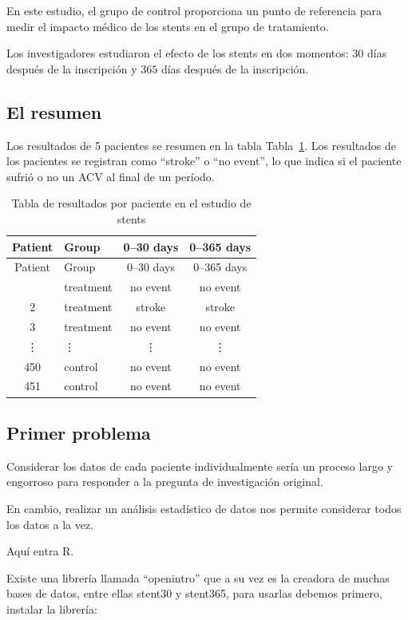 \documentclass[
  spanish,
  letterpaper,
  DIV=11,
  numbers=noendperiod]{scrartcl}
\begin{document}
En este estudio, el grupo de control proporciona un punto de referencia
para medir el impacto médico de los stents en el grupo de tratamiento.

Los investigadores estudiaron el efecto de los stents en dos momentos:
\(30\) días después de la inscripción y \(365\) días después de la
inscripción.

\subsection{El resumen}\label{el-resumen}

Los resultados de 5 pacientes se resumen en la tabla
Tabla~\ref{tbl-stent-data}. Los resultados de los pacientes se registran
como ``stroke'' o ``no event'', lo que indica si el paciente sufrió o no
un ACV al final de un período.

\begin{longtable}[]{@{}clcc@{}}
\caption{Tabla de resultados por paciente en el estudio de
stents}\label{tbl-stent-data}\tabularnewline
\toprule\noalign{}
Patient & Group & 0--30 days & 0--365 days \\
\midrule\noalign{}
\endfirsthead
\toprule\noalign{}
Patient & Group & 0--30 days & 0--365 days \\
\midrule\noalign{}
\endhead
\bottomrule\noalign{}
\endlastfoot
1 & treatment & no event & no event \\
2 & treatment & stroke & stroke \\
3 & treatment & no event & no event \\
⋮ & ⋮ & ⋮ & ⋮ \\
450 & control & no event & no event \\
451 & control & no event & no event \\
\end{longtable}

\subsection{Primer problema}\label{primer-problema}

Considerar los datos de cada paciente individualmente sería un proceso
largo y engorroso para responder a la pregunta de investigación
original.

En cambio, realizar un análisis estadístico de datos nos permite
considerar todos los datos a la vez.

Aquí entra R.

Existe una librería llamada ``openintro'' que a su vez es la creadora de
muchas bases de datos, entre ellas stent30 y stent365, para usarlas
debemos primero, instalar la librería:
\end{document}
